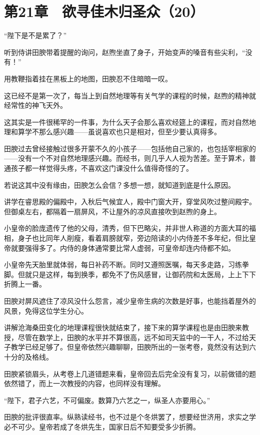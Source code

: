 \section{第21章　欲寻佳木归圣众（20）}

“陛下是不是累了？”

听到侍讲田腴带着提醒的询问，赵煦坐直了身子，开始变声的嗓音有些尖利，“没有！”

用教鞭指着挂在黑板上的地图，田腴忍不住暗暗一叹。

这已经不是第一次了，每当上到自然地理等有关气学的课程的时候，赵煦的精神就经常性的神飞天外。

这其实是一件很稀罕的一件事，为什么天子会那么喜欢经筵上的课程，而对自然地理和算学不那么感兴趣——虽说喜欢也只是相对，但至少要认真得多。

田腴过去曾经接触过很多开蒙不久的小孩子——包括他自己家的，也包括宰相家的——没有一个不对自然地理感兴趣。而经书，则几乎人人视为苦差。至于算术，普通孩子都一样觉得头疼，不喜欢这门课没什么值得奇怪的了。

若说这其中没有缘由，田腴怎么会信？多想一想，就知道到底是什么原因。

讲学在睿思殿的偏殿中，入秋后气候宜人，殿中门窗大开，穿堂风吹过整间殿宇。但御桌左右，都隔着一扇屏风，不让屋外的凉风直接吹到赵煦的身上。

小皇帝的脸庞遗传了他的父母，清秀，但下巴略尖，并非世人称道的方面大耳的福相，身子也比同年人削瘦，看着肩膀就窄，旁边陪读的小内侍差不多年纪，但比皇帝就要强得多了。内侍的身体通常要比常人虚弱，可皇帝却连内侍都不如。

小皇帝先天胎里就体弱，每日补药不断。同时又遵照医嘱，每天多走路，习练拳脚。但就只是这样，每到换季，都免不了伤风感冒，让御药院和太医局，上上下下折腾上一番。

田腴对屏风遮住了凉风没什么怨言，减少皇帝生病的次数是好事，也能挡着屋外的风景，免得这位学生分心。

讲解沧海桑田变化的地理课程很快就结束了，接下来的算学课程也是由田腴来教授，尽管在数学上，田腴的水平并不算很高，远不如司天监中的一干人，不过给天子教学已经足够了。但皇帝依然兴趣聊聊，田腴所出的一张考卷，竟然没有达到六十分的及格线。

田腴紧锁眉头，从考卷上几道错题来看，皇帝回去后完全没有复习，以前做错的题依然错了，而上一次教授的内容，也同样没有理解。

“陛下，君子六艺，不可偏废。数算乃六艺之一，纵圣人亦要用心。”

田腴的批评很直率。纵熟读经书，也不过是个冬烘罢了，想要经世济用，求实之学必不可少。皇帝若成了冬烘先生，国家日后不知要受多少折腾。

